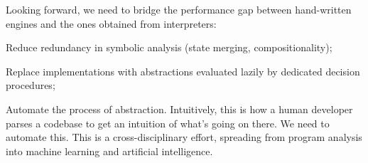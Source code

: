 Looking forward, we need to bridge the performance gap between hand-written engines and the ones obtained from interpreters:

Reduce redundancy in symbolic analysis (state merging, compositionality);

Replace implementations with abstractions evaluated lazily by dedicated decision procedures;

Automate the process of abstraction.  Intuitively, this is how a human developer parses a codebase to get an intuition of what's going on there.  We need to automate this.  This is a cross-disciplinary effort, spreading from program analysis into machine learning and artificial intelligence.


